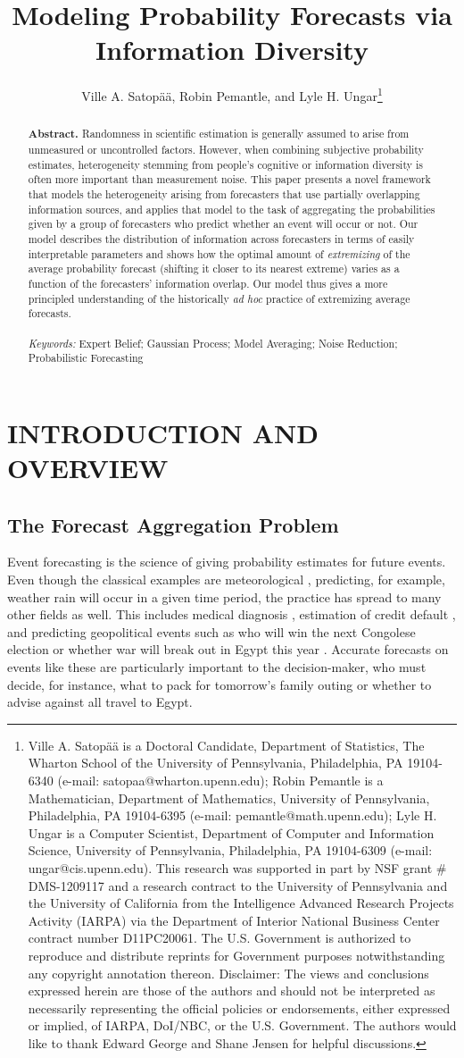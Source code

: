 \documentclass[12pt]{article}
\title{\vspace{-0em} \Large Modeling Probability Forecasts via Information Diversity}
\author{\vspace{-1em}Ville A. Satop\"a\"a, Robin Pemantle, and Lyle H. Ungar\thanks{Ville A. Satop\"a\"a is a Doctoral Candidate, Department of Statistics, The Wharton School of the University of Pennsylvania, Philadelphia, PA 19104-6340 (e-mail: satopaa@wharton.upenn.edu); Robin Pemantle is a Mathematician, Department of Mathematics, University of Pennsylvania, Philadelphia, PA 19104-6395 (e-mail: pemantle@math.upenn.edu); Lyle H. Ungar is a Computer Scientist, Department of Computer and Information Science, University of Pennsylvania, Philadelphia, PA 19104-6309 (e-mail: ungar@cis.upenn.edu). This research was supported in part by NSF grant \# DMS-1209117 and a research contract to the University
of Pennsylvania and the University of California from the Intelligence
Advanced Research Projects Activity (IARPA) via the Department of
Interior National Business Center contract number D11PC20061. The
U.S. Government is authorized to reproduce and distribute reprints for
Government purposes notwithstanding any copyright annotation
thereon. Disclaimer: The views and conclusions expressed herein are
those of the authors and should not be interpreted as necessarily
representing the official policies or endorsements, either expressed
or implied, of IARPA, DoI/NBC, or the U.S. Government.
The authors would like to thank Edward George and Shane Jensen for helpful discussions.}}
\date{\vspace{-8.5ex}}
\theoremstyle{definition}
\theoremstyle{definition}
\begin{document}
\maketitle
\begin{abstract}
\singlespace
\textbf{Abstract.} Randomness in scientific estimation is generally 
assumed to arise from unmeasured or uncontrolled factors. However, 
when combining subjective probability estimates, heterogeneity
stemming from people's cognitive or information diversity is often
more important than measurement noise.  This paper presents a novel
framework that models the heterogeneity arising from forecasters that use 
partially overlapping information sources, and applies that model to 
the task of aggregating the probabilities given by a group of forecasters 
who predict whether an event will occur or not. Our model describes 
the distribution of information across forecasters in terms of easily
interpretable parameters and shows how the optimal amount
of \textit{extremizing} of the average probability forecast (shifting
it closer to its nearest extreme) varies as a function of the forecasters'
information overlap.  Our model thus gives a more principled
understanding of the historically {\it ad hoc} practice of extremizing
average forecasts.\\
\\
\textit{Keywords:} Expert Belief; Gaussian Process; Model
Averaging; Noise Reduction; Probabilistic Forecasting
\end{abstract}




\newpage
\section{INTRODUCTION AND OVERVIEW}

\subsection{The Forecast Aggregation Problem}
Event forecasting is the science of giving probability estimates for future events.  Even though the classical examples are meteorological
\citep{murphy1977reliability}, predicting, for example, weather rain will occur in a given time period, the practice has 
spread to many other fields as well. This includes medical diagnosis  \citep{pepe2003statistical}, estimation of credit default
\citep{kramer2006evaluating}, and predicting geopolitical events such as who will win
the next Congolese election or whether war will break out in Egypt
this year \citep{tetlock2005expert}. Accurate forecasts on events like these are particularly important to the decision-maker, who must decide, for instance, what to pack
for tomorrow's family outing or whether to advise against all travel
to Egypt.
\end{document}
